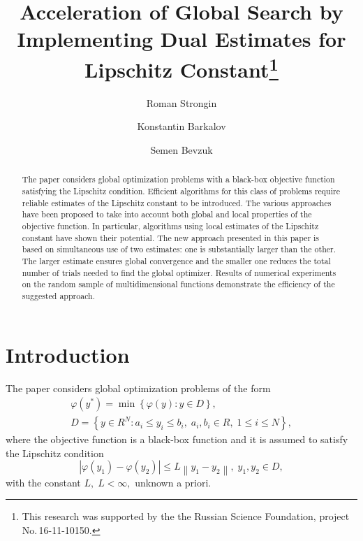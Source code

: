 \documentclass[runningheads]{llncs}
\begin{document}
%
\title{Acceleration of Global Search by Implementing Dual Estimates for Lipschitz Constant\thanks{This research was supported by the the Russian Science Foundation, project No.\,16-11-10150.}}
%
%
\author{Roman Strongin 
\and Konstantin Barkalov 
\and Semen Bevzuk
}
%
%
%
\maketitle              %
%
\begin{abstract}
The paper considers global optimization problems with a black-box objective 
function satisfying the Lipschitz condition. Efficient algorithms for this 
class of problems require reliable estimates of the Lipschitz constant to be 
introduced. The various approaches have been proposed to take into account both
global and local properties of the objective function. In particular, algorithms
using local estimates of the Lipschitz constant have shown their potential.
The new approach presented in this paper is based on simultaneous use of two
estimates: one is substantially larger than the other. 
The larger estimate ensures global convergence and the smaller one reduces 
the total number of trials needed to find the global optimizer.
Results of numerical experiments on the random sample of multidimensional 
functions demonstrate the efficiency of the suggested approach.  

\end{abstract}
%
%
%
\section{Introduction}

The paper considers global optimization problems of the form 
\begin{gather}
 \varphi(y^\ast)=\min{\left\{\varphi(y):y\in D\right\}}, \label{problem}\\
 D=\left\{y\in R^N: a_i\leq y_i \leq b_i, \; a_i,b_i\in R, \;  1\leq i \leq N\right\} \label{D},
\end{gather}
where the objective function is a black-box function and it is assumed to satisfy the Lipschitz condition
\[
\left|\varphi(y_1)-\varphi(y_2)\right|\leq L\left\|y_1-y_2\right\|,\; y_1,y_2 \in D,
\]
with the constant $L, \; L<\infty,$ unknown a priori.
\end{document}
